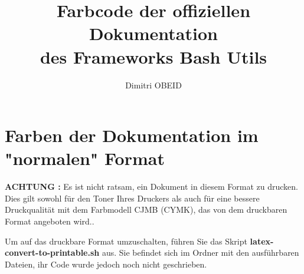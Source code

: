 \documentclass[a4paper,10pt]{article}
\title{\color{red}Farbcode \color{orange}der \color{yellow}offiziellen \color{green}Dokumentation \\\color{blue}des \color{violet}Frameworks \color{red}Bash \color{orange}Utils}\color{text}
\author{Dimitri OBEID}
\begin{document}
    \maketitle
    \newpage

    \color{sec1}
    \section{Farben der Dokumentation im "normalen" Format}\color{text}

    \begin{justify}
        \textbf{\color{case}ACHTUNG :} Es ist nicht ratsam, ein Dokument in diesem Format zu drucken. Dies gilt sowohl für den Toner Ihres Druckers als auch für eine bessere Druckqualität mit dem Farbmodell CJMB (CYMK), das von dem druckbaren Format angeboten wird..

        Um auf das druckbare Format umzuschalten, führen Sie das Skript \textbf{\color{cmds}latex-convert-to-printable.sh} aus. Sie befindet sich im Ordner mit den ausführbaren Dateien, ihr Code wurde jedoch noch nicht geschrieben.
    \end{justify}
\end{document}
